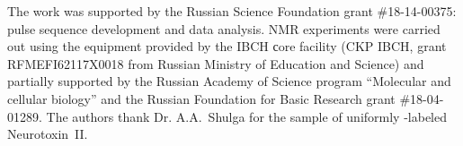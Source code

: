 \documentclass[twocolumn]{svjour3}           %
\begin{document}
\begin{acknowledgements}
The work was supported by the Russian Science Foundation grant 
\#18-14-00375: pulse sequence development and data analysis.  
{NMR} experiments were carried out using the equipment 
provided by the {IBCH} сore facility ({CKP} {IBCH}, grant 
{RFMEFI62117X0018} from Russian Ministry of Education and Science) 
and partially supported by the 
Russian Academy of Science program “Molecular and cellular biology” and the Russian Foundation for Basic Research grant \#18-04-01289. 
The authors thank Dr. A.A.~Shul\-ga for the sample of 
uniformly \nclab-labeled Neurotoxin~II. 
\end{acknowledgements}



%

%
%
\end{document}
